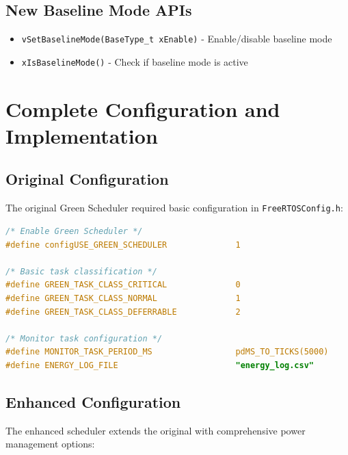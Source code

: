 \documentclass[11pt,a4paper]{article}
\begin{document}
\subsection{New Baseline Mode APIs}
\begin{itemize}
    \item \texttt{vSetBaselineMode(BaseType\_t xEnable)} - Enable/disable baseline mode
    \item \texttt{xIsBaselineMode()} - Check if baseline mode is active
\end{itemize}

\section{Complete Configuration and Implementation}

\subsection{Original Configuration}
The original Green Scheduler required basic configuration in \texttt{FreeRTOSConfig.h}:

\begin{lstlisting}[language=C, caption=Original Green Scheduler Configuration]
/* Enable Green Scheduler */
#define configUSE_GREEN_SCHEDULER              1

/* Basic task classification */
#define GREEN_TASK_CLASS_CRITICAL              0
#define GREEN_TASK_CLASS_NORMAL                1  
#define GREEN_TASK_CLASS_DEFERRABLE            2

/* Monitor task configuration */
#define MONITOR_TASK_PERIOD_MS                 pdMS_TO_TICKS(5000)
#define ENERGY_LOG_FILE                        "energy_log.csv"
\end{lstlisting}

\subsection{Enhanced Configuration}
The enhanced scheduler extends the original with comprehensive power management options:
\end{document}
